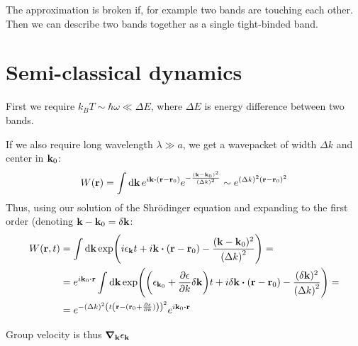 The approximation is broken if, for example two bands are touching each other. Then we can describe two bands together as a single tight-binded band.

\section{Semi-classical dynamics}
First we require $k_BT \sim \hbar \omega \ll \Delta E$, where $\Delta E$ is energy difference between two bands.

If we also require long wavelength $\lambda \gg a$, we get a wavepacket of width $\Delta k$ and center in $\vb{k}_0$:
\begin{align}
W(\vb{r}) = \int \dd{\vb{k}} e^{i\vb{k}\vdot \qty(\vb{r}-\vb{r}_0)}e^{-\frac{(\vb{k}-\vb{k}_0)^2}{\qty(\Delta k)^2}}\sim e^{(\Delta k)^2(\vb{r}-\vb{r}_0)^2}
\end{align}
Thus, using our solution of the Shr\"{o}dinger equation and expanding to the first order (denoting $\vb{k} - \vb{k}_0 = \delta \vb{k}$:
\begin{align}
W(\vb{r}, t) &= \int \dd{\vb{k}} \exp(i\epsilon_{\vb{k}} t + i\vb{k}\vdot \qty(\vb{r}-\vb{r}_0)-\frac{(\vb{k}-\vb{k}_0)^2}{\qty(\Delta k)^2}  ) =\\&=  e^{i\vb{k}_0 \vdot \vb{r}}\int \dd{\vb{k}} \exp(\qty(\epsilon_{\vb{k}_0}  + \pdv{\epsilon}{k} \delta \vb{k})t + i\delta \vb{k} \vdot \qty(\vb{r}-\vb{r}_0)-\frac{(\delta \vb{k})^2}{\qty(\Delta k)^2}  ) =\\&= e^{-(\Delta k)^2 \qty(t\qty(\vb{r} - (\vb{r}_0 + \pdv{\epsilon}{k})))^2} e^{i\vb{k}_0 \vdot \vb{r}}
\end{align}

Group velocity is thus $\grad_{\vb{k}} \epsilon_{\vb{k}}$

